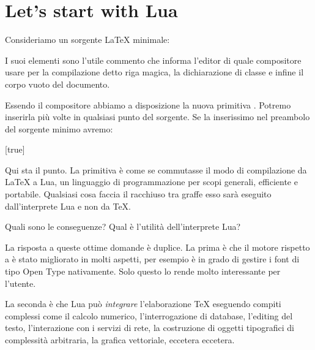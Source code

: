 

\chapter{Let's start with Lua}
\label{iChStart}

Consideriamo un sorgente \LaTeX{} minimale:

I suoi elementi sono l'utile commento che informa l'editor di quale compositore
usare per la compilazione detto riga magica, la dichiarazione di classe e infine
il corpo vuoto del documento.

Essendo il compositore \LuaLaTeX{} abbiamo a disposizione la nuova primitiva
. Potremo inserirla più volte in qualsiasi punto del sorgente. Se
la inserissimo nel preambolo del sorgente minimo avremo:

[true]%
%
%

Qui sta il punto. La primitiva  è come se commutasse il modo di
compilazione da \LaTeX{} a Lua, un linguaggio di programmazione per scopi
generali, efficiente e portabile. Qualsiasi cosa faccia il 
racchiuso tra graffe esso sarà eseguito dall'interprete Lua e non da \TeX.

Quali sono le conseguenze? Qual è l'utilità dell'interprete Lua?

%
La risposta a queste ottime domande è duplice. La prima è che il motore
 rispetto a  è stato migliorato in molti aspetti, per
esempio è in grado di gestire i font di tipo Open Type nativamente. Solo questo
lo rende molto interessante per l'utente.

La seconda è che Lua può \emph{integrare} l'elaborazione \TeX{} eseguendo
compiti complessi come il calcolo numerico, l'interrogazione di database,
l'editing del testo, l'interazione con i servizi di rete, la costruzione di
oggetti tipografici di complessità arbitraria, la grafica vettoriale, eccetera
eccetera.


